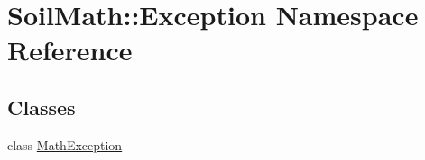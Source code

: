 \hypertarget{namespace_soil_math_1_1_exception}{}\section{Soil\+Math\+:\+:Exception Namespace Reference}
\label{namespace_soil_math_1_1_exception}
\subsection*{Classes}
\begin{DoxyCompactItemize}
\item 
class \hyperlink{class_soil_math_1_1_exception_1_1_math_exception}{Math\+Exception}
\end{DoxyCompactItemize}
